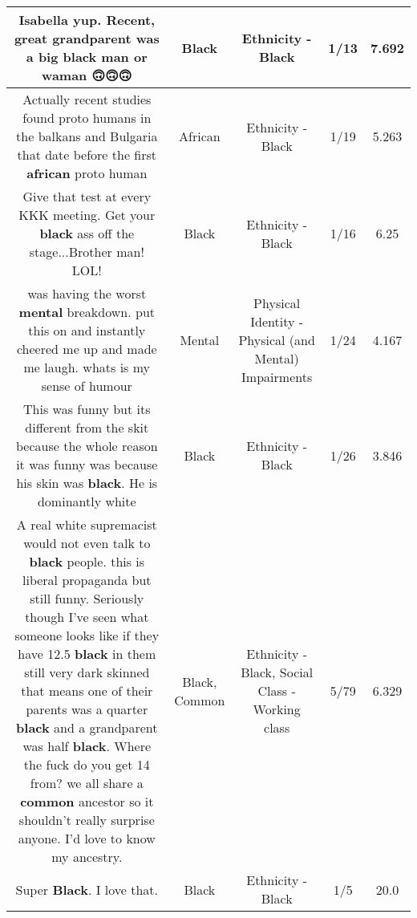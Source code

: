 \documentclass[11pt]{article}
\newlength\mylength
\begin{document}
\begin{center}
\begin{longtable}{|C{.65\mylength}|C{.30\mylength}|C{.12\mylength}|C{.12\mylength}|C{.12\mylength}|}
  \small Isabella yup.  Recent, great grandparent was a big \textbf{black} man or waman 🙃🙃🙃\normalsize   & Black & Ethnicity - Black & 1/13 & 7.692 \\  \hline
  \small Actually recent studies found proto humans in the balkans and Bulgaria that date before the first \textbf{african} proto human\normalsize   & African & Ethnicity - Black & 1/19 & 5.263 \\  \hline
  \small Give that test at every KKK meeting.  Get your \textbf{black} ass off the stage...Brother man!  LOL!\normalsize   & Black & Ethnicity - Black & 1/16 & 6.25 \\  \hline
  \small was having the worst \textbf{mental} breakdown. put this on and instantly cheered me up and made me laugh. whats is my sense of humour\normalsize   & Mental & Physical Identity - Physical (and Mental) Impairments & 1/24 & 4.167 \\  \hline
  \small This was funny but its different from the skit because the whole reason it was funny was because his skin was \textbf{black}. He is dominantly white\normalsize   & Black & Ethnicity - Black & 1/26 & 3.846 \\  \hline
  \small A real white supremacist would not even talk to \textbf{black} people. this is liberal propaganda but still funny. Seriously though I've seen what someone looks like if they have 12.5 \textbf{black} in them still very dark skinned that means one of their parents was a quarter \textbf{black} and a grandparent was half \textbf{black}. Where the fuck do you get 14 from? we all share a \textbf{common} ancestor so it shouldn't really surprise anyone. I'd love to know my ancestry.\normalsize   & Black, Common & Ethnicity - Black, Social Class - Working class & 5/79 & 6.329 \\  \hline
  \small Super \textbf{Black}. I love that.\normalsize   & Black & Ethnicity - Black & 1/5 & 20.0 \\  \hline

\end{longtable}
\end{center}
\end{document}
